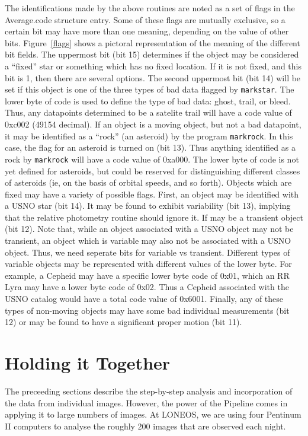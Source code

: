 \documentclass{article}
\begin{document}
The identifications made by the above routines are noted as a set of
flags in the Average.code structure entry.  Some of these flags are
mutually exclusive, so a certain bit may have more than one meaning,
depending on the value of other bits.  Figure~\ref{flags} shows a
pictoral representation of the meaning of the different bit fields.
The uppermost bit (bit 15) determines if the object may be considered
a ``fixed'' star or something which has no fixed location.  If it is
not fixed, and this bit is 1, then there are several options.  The
second uppermost bit (bit 14) will be set if this object is one of the
three types of bad data flagged by {\tt markstar}.  The lower byte of
code is used to define the type of bad data: ghost, trail, or bleed.
Thus, any datapoints determined to be a satelite trail will have a
code value of 0xc002 (49154 decimal).  If an object is a moving
object, but not a bad datapoint, it may be identified as a ``rock''
(an asteroid) by the program {\tt markrock}.  In this case, the flag
for an asteroid is turned on (bit 13).  Thus anything identified as a
rock by {\tt markrock} will have a code value of 0xa000.  The lower
byte of code is not yet defined for asteroids, but could be reserved
for distinguishing different classes of asteroids (ie, on the basis of
orbital speeds, and so forth).  Objects which are fixed may have a
variety of possible flags.  First, an object may be identified with a
USNO star (bit 14).  It may be found to exhibit variability (bit 13),
implying that the relative photometry routine should ignore it.  If
may be a transient object (bit 12).  Note that, while an object
associated with a USNO object may not be transient, an object which is
variable may also not be associated with a USNO object.  Thus, we need
seperate bits for variable vs transient.  Different types of variable
objects may be represented with different values of the lower byte.
For example, a Cepheid may have a specific lower byte code of 0x01,
which an RR Lyra may have a lower byte code of 0x02.  Thus a Cepheid
associated with the USNO catalog would have a total code value of
0x6001. Finally, any of these types of non-moving objects may have
some bad individual measurements (bit 12) or may be found to have a
significant proper motion (bit 11).

\section{Holding it Together}

The preceeding sections describe the step-by-step analysis and
incorporation of the data from individual images.  However, the power
of the Pipeline comes in applying it to large numbers of images.  At
LONEOS, we are using four Pentinum II computers to analyse the roughly 200
images that are observed each night.  
\end{document}
